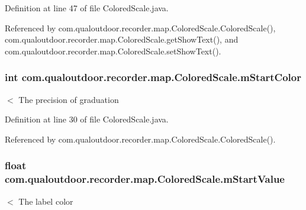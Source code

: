 Definition at line 47 of file Colored\-Scale.\-java.



Referenced by com.\-qualoutdoor.\-recorder.\-map.\-Colored\-Scale.\-Colored\-Scale(), com.\-qualoutdoor.\-recorder.\-map.\-Colored\-Scale.\-get\-Show\-Text(), and com.\-qualoutdoor.\-recorder.\-map.\-Colored\-Scale.\-set\-Show\-Text().

\hypertarget{classcom_1_1qualoutdoor_1_1recorder_1_1map_1_1ColoredScale_a6cf7926b347e1eed939659ea7f1bd320}{
\subsubsection[{m\-Start\-Color}]{\setlength{\rightskip}{0pt plus 5cm}int com.\-qualoutdoor.\-recorder.\-map.\-Colored\-Scale.\-m\-Start\-Color\hspace{0.3cm}{\ttfamily [private]}}}\label{classcom_1_1qualoutdoor_1_1recorder_1_1map_1_1ColoredScale_a6cf7926b347e1eed939659ea7f1bd320}
$<$ The precision of graduation 

Definition at line 30 of file Colored\-Scale.\-java.



Referenced by com.\-qualoutdoor.\-recorder.\-map.\-Colored\-Scale.\-Colored\-Scale().

\hypertarget{classcom_1_1qualoutdoor_1_1recorder_1_1map_1_1ColoredScale_a4188abd3292c87be882a40a1adc507d1}{
\subsubsection[{m\-Start\-Value}]{\setlength{\rightskip}{0pt plus 5cm}float com.\-qualoutdoor.\-recorder.\-map.\-Colored\-Scale.\-m\-Start\-Value\hspace{0.3cm}{\ttfamily [private]}}}\label{classcom_1_1qualoutdoor_1_1recorder_1_1map_1_1ColoredScale_a4188abd3292c87be882a40a1adc507d1}
$<$ The label color 

